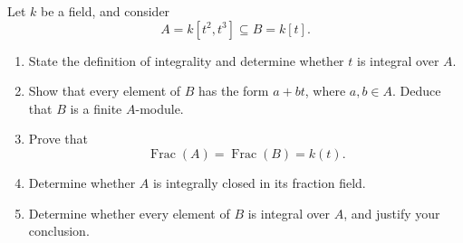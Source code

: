 \documentclass[11pt]{article}
\begin{document}
\begin{prob*}
    Let \(k\) be a field, and consider
    \[
        A=k[t^2,t^3]\subseteq B=k[t].
    \]

    \begin{enumerate}[label=\alph*)]
        \item State the definition of integrality
        and determine whether \(t\) is integral
        over \(A\).

        \item Show that every element of \(B\)
        has the form \(a+bt\), where \(a,b\in A\).
        Deduce that \(B\) is a finite \(A\)-module.

        \item Prove that
        \[
            \operatorname{Frac}(A)
            =\operatorname{Frac}(B)=k(t).
        \]

        \item Determine whether \(A\) is
        integrally closed in its fraction field.

        \item Determine whether every element
        of \(B\) is integral over \(A\), and
        justify your conclusion.
    \end{enumerate}
\end{prob*}
\end{document}
